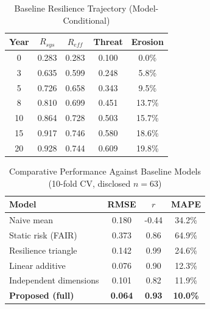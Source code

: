\begin{table}[!t]
\centering
\caption{Baseline Resilience Trajectory (Model-Conditional)}
\label{tab:baseline_live}
\scriptsize
\renewcommand{\arraystretch}{1.15}
\begin{tabular}{ccccc}
\toprule
\textbf{Year} & \textbf{$R_{sys}$} & \textbf{$R_{eff}$} & \textbf{Threat} & \textbf{Erosion} \\
\midrule
0 & 0.283 & 0.283 & 0.100 & 0.0\% \\
3 & 0.635 & 0.599 & 0.248 & 5.8\% \\
5 & 0.726 & 0.658 & 0.343 & 9.5\% \\
8 & 0.810 & 0.699 & 0.451 & 13.7\% \\
10 & 0.864 & 0.728 & 0.503 & 15.7\% \\
15 & 0.917 & 0.746 & 0.580 & 18.6\% \\
20 & 0.928 & 0.744 & 0.609 & 19.8\% \\
\bottomrule
\end{tabular}
\end{table}

\begin{table}[!t]
\centering
\caption{Comparative Performance Against Baseline Models (10-fold CV, disclosed $n=63$)}
\label{tab:validation_live}
\scriptsize
\renewcommand{\arraystretch}{1.15}
\begin{tabular}{lccc}
\toprule
\textbf{Model} & \textbf{RMSE} & \textbf{$r$} & \textbf{MAPE} \\
\midrule
Naive mean & 0.180 & -0.44 & 34.2\% \\
Static risk (FAIR) & 0.373 & 0.86 & 64.9\% \\
Resilience triangle & 0.142 & 0.99 & 24.6\% \\
Linear additive & 0.076 & 0.90 & 12.3\% \\
Independent dimensions & 0.101 & 0.82 & 11.9\% \\
\textbf{Proposed (full)} & \textbf{0.064} & \textbf{0.93} & \textbf{10.0\%} \\
\bottomrule
\end{tabular}
\end{table}

